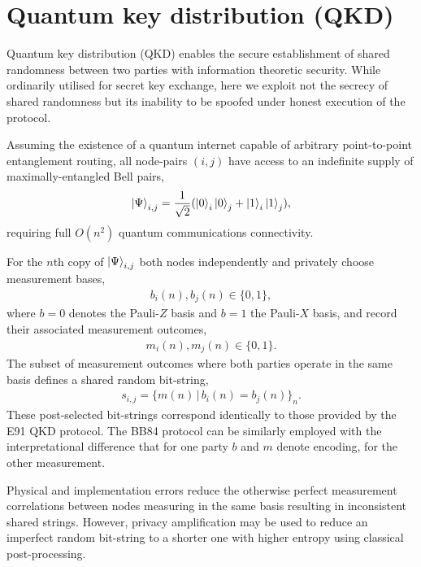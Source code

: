\section{Quantum key distribution (QKD)} \label{sec:QKD}

Quantum key distribution (QKD) \cite{BB84, E91} enables the secure establishment of shared randomness between two parties with information theoretic security. While ordinarily utilised for secret key exchange, here we exploit not the secrecy of shared randomness but its inability to be spoofed under honest execution of the protocol.

Assuming the existence of a quantum internet \cite{RohdeQI} capable of arbitrary point-to-point entanglement routing, all node-pairs $(i,j)$ have access to an indefinite supply of maximally-entangled Bell pairs,
\begin{align}
	\ket{\Psi}_{i,j} = \frac{1}{\sqrt{2}}(\ket{0}_i\ket{0}_j+\ket{1}_i\ket{1}_j),
\end{align}
requiring full $O(n^2)$ quantum communications connectivity.

For the $n$th copy of $\ket{\Psi}_{i,j}$ both nodes independently and privately choose measurement bases,
\begin{align}
	b_i(n),b_j(n)\in\{0,1\},
\end{align}
where \mbox{$b=0$} denotes the Pauli-$Z$ basis and $b=1$ the Pauli-$X$ basis, and record their associated measurement outcomes,
\begin{align}
	m_i(n),m_j(n)\in\{0,1\}.
\end{align}
The subset of measurement outcomes where both parties operate in the same basis defines a shared random bit-string,
\begin{align}
	s_{i,j} = \{m(n)\,|\, b_i(n)=b_j(n)\}_n.
\end{align}
These post-selected bit-strings correspond identically to those provided by the E91 \cite{E91} QKD protocol. The BB84 protocol \cite{BB84} can be similarly employed with the interpretational difference that for one party $b$ and $m$ denote encoding, for the other measurement.

Physical and implementation errors reduce the otherwise perfect measurement correlations between nodes measuring in the same basis resulting in inconsistent shared strings. However, privacy amplification \cite{PrivacyAmp} may be used to reduce an imperfect random bit-string to a shorter one with higher entropy using classical post-processing.

%

